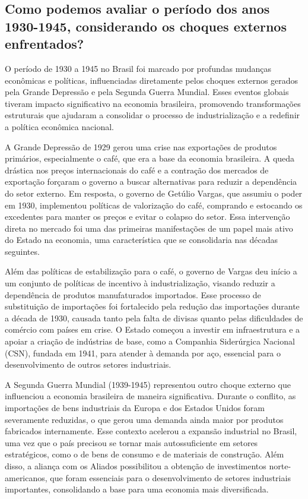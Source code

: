 \documentclass[a4paper,12pt]{article}[abntex2]
\begin{document}
\subsection{\textbf{Como podemos avaliar o período dos anos 1930-1945, considerando os choques externos enfrentados?}}

O período de 1930 a 1945 no Brasil foi marcado por profundas mudanças econômicas e políticas, influenciadas diretamente pelos choques externos gerados pela Grande Depressão e pela Segunda Guerra Mundial. Esses eventos globais tiveram impacto significativo na economia brasileira, promovendo transformações estruturais que ajudaram a consolidar o processo de industrialização e a redefinir a política econômica nacional.

A Grande Depressão de 1929 gerou uma crise nas exportações de produtos primários, especialmente o café, que era a base da economia brasileira. A queda drástica nos preços internacionais do café e a contração dos mercados de exportação forçaram o governo a buscar alternativas para reduzir a dependência do setor externo. Em resposta, o governo de Getúlio Vargas, que assumiu o poder em 1930, implementou políticas de valorização do café, comprando e estocando os excedentes para manter os preços e evitar o colapso do setor. Essa intervenção direta no mercado foi uma das primeiras manifestações de um papel mais ativo do Estado na economia, uma característica que se consolidaria nas décadas seguintes.

Além das políticas de estabilização para o café, o governo de Vargas deu início a um conjunto de políticas de incentivo à industrialização, visando reduzir a dependência de produtos manufaturados importados. Esse processo de substituição de importações foi fortalecido pela redução das importações durante a década de 1930, causada tanto pela falta de divisas quanto pelas dificuldades de comércio com países em crise. O Estado começou a investir em infraestrutura e a apoiar a criação de indústrias de base, como a Companhia Siderúrgica Nacional (CSN), fundada em 1941, para atender à demanda por aço, essencial para o desenvolvimento de outros setores industriais.

A Segunda Guerra Mundial (1939-1945) representou outro choque externo que influenciou a economia brasileira de maneira significativa. Durante o conflito, as importações de bens industriais da Europa e dos Estados Unidos foram severamente reduzidas, o que gerou uma demanda ainda maior por produtos fabricados internamente. Esse contexto acelerou a expansão industrial no Brasil, uma vez que o país precisou se tornar mais autossuficiente em setores estratégicos, como o de bens de consumo e de materiais de construção. Além disso, a aliança com os Aliados possibilitou a obtenção de investimentos norte-americanos, que foram essenciais para o desenvolvimento de setores industriais importantes, consolidando a base para uma economia mais diversificada.
\end{document}
